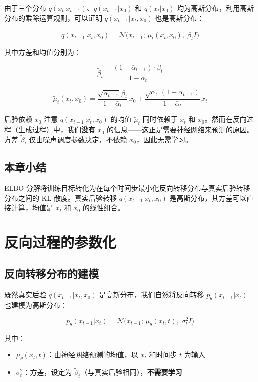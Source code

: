 \documentclass[a4paper]{article}
\begin{document}
由于三个分布 $q(x_t|x_{t-1})$、$q(x_{t-1}|x_0)$ 和 $q(x_t|x_0)$ 均为高斯分布，利用高斯分布的乘除运算规则，可以证明 $q(x_{t-1}|x_t, x_0)$ 也是高斯分布：

$$q(x_{t-1}|x_t, x_0) = \mathcal{N}\big(x_{t-1};\, \tilde{\mu}_t(x_t, x_0),\; \tilde{\beta}_t I\big)$$

其中方差和均值分别为：

$$\tilde{\beta}_t = \frac{(1 - \bar{\alpha}_{t-1}) \cdot \beta_t}{1 - \bar{\alpha}_t}$$

$$\tilde{\mu}_t(x_t, x_0) = \frac{\sqrt{\bar{\alpha}_{t-1}}\, \beta_t}{1 - \bar{\alpha}_t}\, x_0 + \frac{\sqrt{\alpha_t}\, (1 - \bar{\alpha}_{t-1})}{1 - \bar{\alpha}_t}\, x_t$$

\begin{warningbox}{后验依赖 $x_0$}
注意 $q(x_{t-1}|x_t, x_0)$ 的均值 $\tilde{\mu}_t$ 同时依赖于 $x_t$ 和 $x_0$。然而在反向过程（生成过程）中，我们\textbf{没有} $x_0$ 的信息——这正是需要神经网络来预测的原因。方差 $\tilde{\beta}_t$ 仅由噪声调度参数决定，不依赖 $x_0$，因此无需学习。
\end{warningbox}

\subsection{本章小结}

ELBO 分解将训练目标转化为在每个时间步最小化反向转移分布与真实后验转移分布之间的 KL 散度。真实后验转移 $q(x_{t-1}|x_t, x_0)$ 是高斯分布，其方差可以直接计算，均值是 $x_t$ 和 $x_0$ 的线性组合。


\section{反向过程的参数化}

\subsection{反向转移分布的建模}

既然真实后验 $q(x_{t-1}|x_t, x_0)$ 是高斯分布，我们自然将反向转移 $p_\theta(x_{t-1}|x_t)$ 也建模为高斯分布：

$$p_\theta(x_{t-1}|x_t) = \mathcal{N}\big(x_{t-1};\, \mu_\theta(x_t, t),\; \sigma_t^2 I\big)$$

其中：
\begin{itemize}
    \item $\mu_\theta(x_t, t)$：由神经网络预测的均值，以 $x_t$ 和时间步 $t$ 为输入
    \item $\sigma_t^2$：方差，设定为 $\tilde{\beta}_t$（与真实后验相同），\textbf{不需要学习}
\end{itemize}
\end{document}
